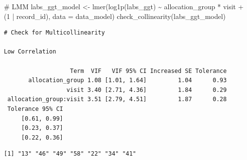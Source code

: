 \documentclass[
  letterpaper,
  DIV=11,
  numbers=noendperiod]{scrartcl}
\newenvironment{Shaded}{\begin{snugshade}}{\end{snugshade}}
\newcommand{\AttributeTok}[1]{\textcolor[rgb]{0.40,0.45,0.13}{#1}}
\newcommand{\CommentTok}[1]{\textcolor[rgb]{0.37,0.37,0.37}{#1}}
\newcommand{\DecValTok}[1]{\textcolor[rgb]{0.68,0.00,0.00}{#1}}
\newcommand{\FunctionTok}[1]{\textcolor[rgb]{0.28,0.35,0.67}{#1}}
\newcommand{\NormalTok}[1]{\textcolor[rgb]{0.00,0.23,0.31}{#1}}
\newcommand{\OtherTok}[1]{\textcolor[rgb]{0.00,0.23,0.31}{#1}}
\newcommand{\SpecialCharTok}[1]{\textcolor[rgb]{0.37,0.37,0.37}{#1}}
\newcommand{\StringTok}[1]{\textcolor[rgb]{0.13,0.47,0.30}{#1}}
\begin{document}
\begin{Shaded}
\begin{Highlighting}[]
\CommentTok{\# LMM}
\NormalTok{labs\_ggt\_model }\OtherTok{\textless{}{-}} \FunctionTok{lmer}\NormalTok{(}\FunctionTok{log1p}\NormalTok{(labs\_ggt) }\SpecialCharTok{\textasciitilde{}}\NormalTok{ allocation\_group }\SpecialCharTok{*}\NormalTok{ visit }\SpecialCharTok{+}\NormalTok{ (}\DecValTok{1} \SpecialCharTok{|}\NormalTok{ record\_id), }\AttributeTok{data =}\NormalTok{ data\_model)}
\FunctionTok{check\_collinearity}\NormalTok{(labs\_ggt\_model)}
\end{Highlighting}
\end{Shaded}

\begin{verbatim}
# Check for Multicollinearity

Low Correlation

                   Term  VIF   VIF 95% CI Increased SE Tolerance
       allocation_group 1.08 [1.01, 1.64]         1.04      0.93
                  visit 3.40 [2.71, 4.36]         1.84      0.29
 allocation_group:visit 3.51 [2.79, 4.51]         1.87      0.28
 Tolerance 95% CI
     [0.61, 0.99]
     [0.23, 0.37]
     [0.22, 0.36]
\end{verbatim}

\begin{Shaded}
\end{Shaded}

\begin{verbatim}
[1] "13" "46" "49" "58" "22" "34" "41"
\end{verbatim}
\end{document}
